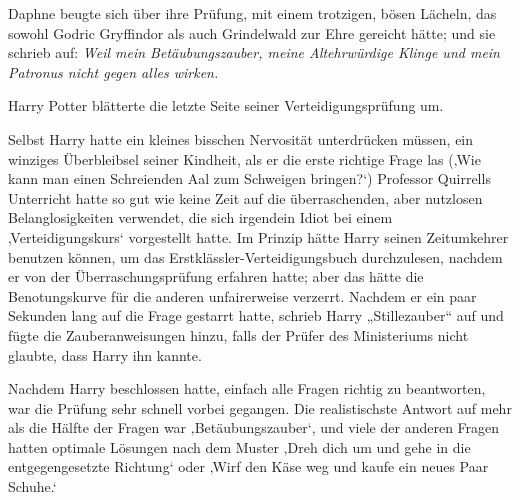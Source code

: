 Daphne beugte sich über ihre Prüfung, mit einem trotzigen, bösen Lächeln, das sowohl Godric Gryffindor als auch Grindelwald zur Ehre gereicht hätte; und sie schrieb auf:
\emph{Weil mein Betäubungszauber, meine Altehrwürdige Klinge und mein Patronus nicht gegen alles wirken.}

\later

Harry Potter blätterte die letzte Seite seiner Verteidigungsprüfung um.

Selbst Harry hatte ein kleines bisschen Nervosität unterdrücken müssen, ein winziges Überbleibsel seiner Kindheit, als er die erste richtige Frage las (‚Wie kann man einen Schreienden Aal zum Schweigen bringen?‘) Professor Quirrells Unterricht hatte so gut wie keine Zeit auf die überraschenden, aber nutzlosen Belanglosigkeiten verwendet, die sich irgendein Idiot bei einem ‚Verteidigungskurs‘ vorgestellt hatte. Im Prinzip hätte Harry seinen Zeitumkehrer benutzen können, um das Erstklässler-Verteidigungsbuch durchzulesen, nachdem er von der Überraschungsprüfung erfahren hatte; aber das hätte die Benotungskurve für die anderen unfairerweise verzerrt. Nachdem er ein paar Sekunden lang auf die Frage gestarrt hatte, schrieb Harry „Stillezauber“ auf und fügte die Zauberanweisungen hinzu, falls der Prüfer des Ministeriums nicht glaubte, dass Harry ihn kannte.

Nachdem Harry beschlossen hatte, einfach alle Fragen richtig zu beantworten, war die Prüfung sehr schnell vorbei gegangen. Die realistischste Antwort auf mehr als die Hälfte der Fragen war ‚Betäubungszauber‘, und viele der anderen Fragen hatten optimale Lösungen nach dem Muster ‚Dreh dich um und gehe in die entgegengesetzte Richtung‘ oder ‚Wirf den Käse weg und kaufe ein neues Paar Schuhe.‘

